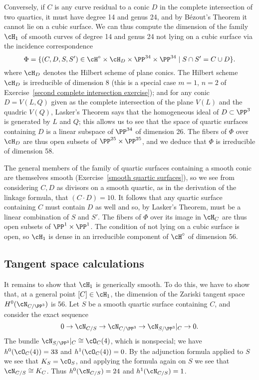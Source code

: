 Conversely, if $C$ is any curve residual to a conic $D$ in the complete intersection of two quartics, it must have degree 14 and genus 24, and by B\'ezout's Theorem it cannot lie on a cubic surface. We can thus compute the dimension of the family $\cH_1$ of smooth curves of degree 14 and genus 24 not lying on a cubic surface via the incidence correspondence
$$
\Phi = \{ (C, D, S, S') \in \cH^\circ \times \cH_D \times \PP^{34} \times \PP^{34} \mid S \cap S' = C \cup D\}.
$$
where $\cH_D$ denotes the Hilbert scheme of plane conics. The Hilbert scheme $\cH_D$ is irreducible of dimension 8 (this is a special case $m=1$, $n=2$ of Exercise~\ref{second complete intersection exercise}); and for any conic $D = V(L,Q)$ given as the complete intersection of the plane $V(L)$ and the quadric $V(Q)$, Lasker's Theorem says that the homogeneous ideal of $D \subset \PP^3$ is generated by $L$ and $Q$; this allows us to see that  the space of quartic surfaces containing $D$ is a linear subspace of $\PP^{34}$ of dimension 26. The fibers of $\Phi$ over $\cH_D$ are thus open subsets of $\PP^{25} \times \PP^{25}$, and we deduce that $\Phi$ is irreducible of dimension 58. 


The general members of the family of quartic surfaces containing a smooth conic are themselves smooth (Exercise~\ref{smooth quartic surfaces}), so we see from considering $C,D$ as divisors on a smooth quartic, as in the derivation of the linkage formula, that $(C\cdot D) = 10$. It follows that any quartic surface containing $C$ must contain $D$ as well and so, by Lasker's Theorem, must be a linear combination of $S$ and $S'$.   The fibers of $\Phi$ over its image in $\cH_C$ are thus open subsets of $\PP^1 \times \PP^1$. 
The condition of not lying on a cubic surface is open, so $\cH_1$  is dense in an irreducible component of $\cH^\circ$ of dimension 56.

\subsection{Tangent space calculations}

It remains to show that $\cH_1$ is generically smooth. To do this, we have to show that,
at a general point $[C] \in \cH_{1}$, the dimension of the Zariski tangent space $H^0(\cN_{C/\PP^3})$  is 56. 
Let $S$ be a smooth quartic surface containing $C$, and consider the exact sequence 
\begin{equation}\label{normal bundle sequence}
 0 \to \cN_{C/S} \to \cN_{C/\PP^3} \to \cN_{S/\PP^3}|_C \to 0.
\end{equation}
The bundle $\cN_{S/\PP^3}|_C \cong \cO_C(4)$, which is nonspecial; we have $h^0(\cO_C(4)) = 33$ and $h^1(\cO_C(4)) = 0$. By the adjunction formula applied to $S$ we see that $K_S = \cO_S$, and applying the formula again on $S$ we see that $\cN_{C/S} \cong K_C$. Thus $h^0(\cN_{C/S}) = 24$ and $h^1(\cN_{C/S}) = 1$.

